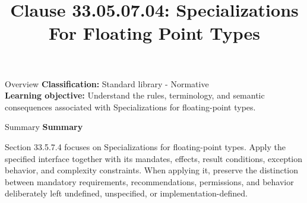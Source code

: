 \documentclass[10pt,letterpaper]{article}
\title{Clause 33.05.07.04: Specializations For Floating Point Types}
\author{}
\date{}
\begin{document}
\maketitle
\begin{CornellOverviewBox}{Overview}
\textbf{Classification:} Standard library - Normative\\[2pt]
\textbf{Learning objective:} Understand the rules, terminology, and semantic consequences associated with Specializations for floating-point types.
\end{CornellOverviewBox}\begin{CornellSummaryBox}{Summary}
{\sffamily\bfseries\color{Accent} Summary}\par\vspace{3pt}Section 33.5.7.4 focuses on Specializations for floating-point types. Apply the specified interface together with its mandates, effects, result conditions, exception behavior, and complexity constraints. When applying it, preserve the distinction between mandatory requirements, recommendations, permissions, and behavior deliberately left undefined, unspecified, or implementation-defined.
\end{CornellSummaryBox}
\end{document}
